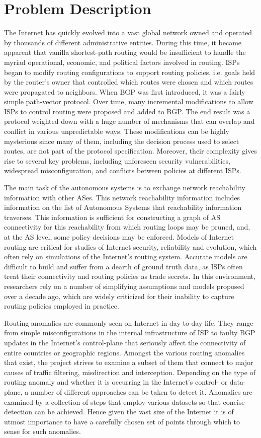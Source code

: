 \documentclass{sig-alternate-05-2015}
\begin{document}
\section{Problem Description}
The Internet has quickly evolved into a vast global network owned and operated by thousands of different administrative entities. During this time, it became apparent that vanilla shortest-path routing would be insufficient to handle the myriad operational, economic, and political factors involved in routing. ISPs began to modify routing configurations to support routing policies, i.e. goals held by the router's owner that controlled which routes were chosen and which routes were propagated to neighbors. When BGP was first introduced, it was a fairly simple path-vector protocol. Over time, many incremental modifications to allow ISPs to control routing were proposed and added to BGP. The end result was a protocol weighted down with a huge number of mechanisms that can overlap and conflict in various unpredictable ways. These modifications can be highly mysterious since many of them, including the decision process used to select routes, are not part of the protocol specification. Moreover, their complexity gives rise to several key problems, including unforeseen security vulnerabilities, widespread misconfiguration, and conflicts between policies at different ISPs.


The main task of the autonomous systems is to exchange network reachability information with other ASes.  This network reachability information includes information on the list of  Autonomous Systems that reachability information traverses. This information is sufficient for constructing a graph of AS connectivity for this reachability from which routing loops may be pruned, and, at the AS level, some policy decisions may be enforced. Models of Internet routing are critical for studies of Internet security, reliability and evolution, which often rely on simulations of the Internet's routing system. Accurate models are difficult to build and suffer from a dearth of ground truth data, as ISPs often treat their connectivity and routing policies as trade secrets. In this environment, researchers rely on a number of simplifying assumptions and models proposed over a decade ago, which are widely criticized for their inability to capture routing policies employed in practice.

Routing anomalies are commonly seen on Internet in day-to-day life. They range from simple misconfigurations in the internal infrastructure of ISP to faulty BGP updates in the Internet's control-plane that seriously affect the connectivity of entire countries or geographic regions. Amongst the various routing anomalies that exist, the project strives to examine a subset of them that connect to major causes of traffic filtering, misdirection and interception. Depending on the type of routing anomaly and whether it is occurring in the Internet's control- or data-plane, a number of different approaches can be taken to detect it. Anomalies are examined by a collection of steps that employ various datasets so that concise detection can be achieved. Hence given the vast size of the Internet it is of utmost importance to have a carefully chosen set of points through which to sense for such anomalies.
\end{document}
